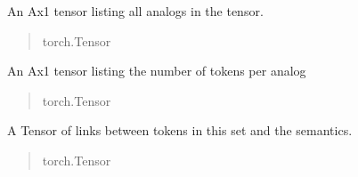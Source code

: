 \documentclass[letterpaper,10pt,english]{sphinxmanual}
\begin{document}
\begin{fulllineitems}

\begin{fulllineitems}
\label{\detokenize{nodes:nodes.nodeTensors.Recipient.analogs}}
\pysigstartsignatures
\pysigline
{}
\pysigstopsignatures
\sphinxAtStartPar
An Ax1 tensor listing all analogs in the tensor.
\begin{quote}\begin{description}
\sphinxAtStartPar
torch.Tensor

\end{description}\end{quote}

\end{fulllineitems}


\begin{fulllineitems}
\label{\detokenize{nodes:nodes.nodeTensors.Recipient.analog_counts}}
\pysigstartsignatures
\pysigline
{}
\pysigstopsignatures
\sphinxAtStartPar
An Ax1 tensor listing the number of tokens per analog
\begin{quote}\begin{description}
\sphinxAtStartPar
torch.Tensor

\end{description}\end{quote}

\end{fulllineitems}


\begin{fulllineitems}
\label{\detokenize{nodes:nodes.nodeTensors.Recipient.links}}
\pysigstartsignatures
\pysigline
{}
\pysigstopsignatures
\sphinxAtStartPar
A Tensor of links between tokens in this set and the semantics.
\begin{quote}\begin{description}
\sphinxAtStartPar
torch.Tensor

\end{description}\end{quote}


\end{fulllineitems}
\end{fulllineitems}
\end{document}
